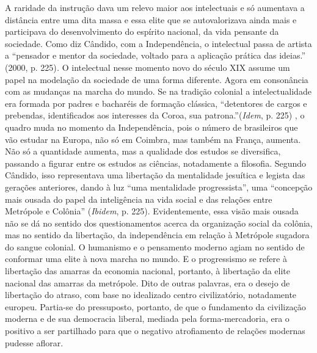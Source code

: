 A raridade da instrução dava um relevo maior aos intelectuais e só
aumentava a distância entre uma dita massa e essa elite que se
autovalorizava ainda mais e participava do desenvolvimento do espírito
nacional, da vida pensante da sociedade. Como diz Cândido, com a
Independência, o intelectual passa de artista a ``pensador e mentor da
sociedade, voltado para a aplicação prática das ideias.'' (2000, p.
225)\emph{.} O intelectual nesse momento novo do século XIX assume um
papel na modelação da sociedade de uma forma diferente. Agora em
consonância com as mudanças na marcha do mundo. Se na tradição colonial
a intelectualidade era formada por padres e bacharéis de formação
clássica, ``detentores de cargos e prebendas, identificados aos
interesses da Coroa, sua patrona.''(\emph{Idem}, p. 225) , o quadro muda
no momento da Independência, pois o número de brasileiros que vão
estudar na Europa, não só em Coimbra, mas também na França, aumenta. Não
só a quantidade aumenta, mas a qualidade dos estudos se diversifica,
passando a figurar entre os estudos as ciências, notadamente a
filosofia. Segundo Cândido, isso representava uma libertação da
mentalidade jesuítica e legista das gerações anteriores, dando à luz
``uma mentalidade progressista'', uma ``concepção mais ousada do papel
da inteligência na vida social e das relações entre Metrópole e
Colônia'' (\emph{Ibidem}, p. 225). Evidentemente, essa visão mais ousada
não se dá no sentido dos questionamentos acerca da organização social da
colônia, mas no sentido da libertação, da independência em relação à
Metrópole sugadora do sangue colonial. O humanismo e o pensamento
moderno agiam no sentido de conformar uma elite à nova marcha no mundo.
E o progressismo se refere à libertação das amarras da economia
nacional, portanto, à libertação da elite nacional das amarras da
metrópole. Dito de outras palavras, era o desejo de libertação do
atraso, com base no idealizado centro civilizatório, notadamente
europeu. Partia-se do pressuposto, portanto, de que o fundamento da
civilização moderna e de sua democracia liberal, mediada pela
forma-mercadoria, era o positivo a ser partilhado para que o negativo
atrofiamento de relações modernas pudesse aflorar.

